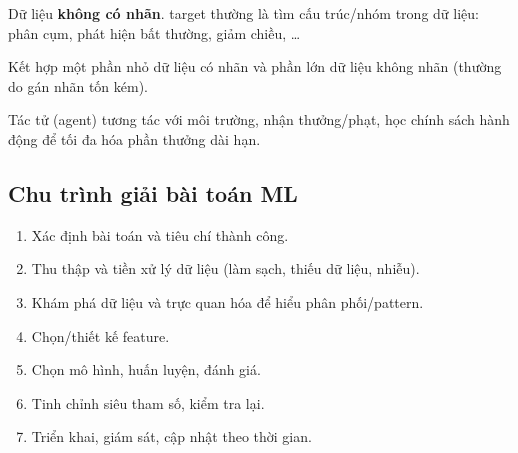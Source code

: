 \begin{dinhnghia}[title={Học không giám sát (Unsupervised)}]
Dữ liệu \textbf{không có nhãn}. target thường là tìm cấu trúc/nhóm trong dữ liệu:
phân cụm, phát hiện bất thường, giảm chiều, \ldots
\end{dinhnghia}

\begin{vidu}[title={Minh hoạ unsupervised}]
\end{vidu}

\begin{dinhnghia}[title={Bán giám sát (Semi-supervised)}]
Kết hợp một phần nhỏ dữ liệu có nhãn và phần lớn dữ liệu không nhãn (thường do gán nhãn tốn kém).
\end{dinhnghia}

\begin{vidu}[title={Minh hoạ semi-supervised}]
\end{vidu}

\begin{dinhnghia}[title={Tăng cường (Reinforcement)}]
Tác tử (agent) tương tác với môi trường, nhận thưởng/phạt, học chính sách hành động để tối đa hóa phần thưởng dài hạn.
\end{dinhnghia}

\begin{vidu}[title={Minh hoạ reinforcement}]
\end{vidu}

\subsection{Chu trình giải bài toán ML}
\label{sec:chu-trinh-ml}

\begin{phuongphap}[title={Chuỗi bước điển hình (nhìn từ góc ``thực hành'')}]
\begin{enumerate}
  \item Xác định bài toán và tiêu chí thành công.
  \item Thu thập và tiền xử lý dữ liệu (làm sạch, thiếu dữ liệu, nhiễu).
  \item Khám phá dữ liệu và trực quan hóa để hiểu phân phối/pattern.
  \item Chọn/thiết kế feature.
  \item Chọn mô hình, huấn luyện, đánh giá.
  \item Tinh chỉnh siêu tham số, kiểm tra lại.
  \item Triển khai, giám sát, cập nhật theo thời gian.
\end{enumerate}
\end{phuongphap}

\begin{vidu}[title={Hình minh hoạ khái niệm nền}]
\end{vidu}

